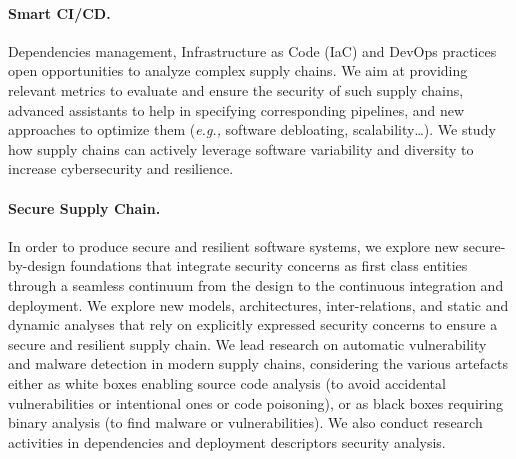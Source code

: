 \paragraph{Smart CI/CD.} Dependencies management, Infrastructure as Code (IaC) and DevOps practices open opportunities to analyze complex supply chains. We aim at providing relevant metrics to evaluate and ensure the security of such supply chains, advanced assistants to help in specifying corresponding pipelines, and new approaches to optimize them (\emph{e.g.,} software debloating, scalability\ldots).
We study how supply chains can actively leverage software variability and diversity to increase cybersecurity and resilience. 

\paragraph{Secure Supply Chain.} In order to produce secure and resilient software systems, we explore new secure-by-design foundations that integrate security concerns as first class entities through a seamless continuum from the design to the continuous integration and deployment. 
We explore new models, architectures, inter-relations, and static and dynamic analyses that rely on explicitly expressed security concerns to ensure a secure and resilient supply chain. 
We lead research on automatic vulnerability and malware detection in modern supply chains, considering the various artefacts either as white boxes enabling source code analysis (to avoid accidental vulnerabilities or intentional ones or code poisoning), or as black boxes requiring binary analysis (to find malware or vulnerabilities).
We also conduct research activities in dependencies and deployment descriptors security analysis. 


